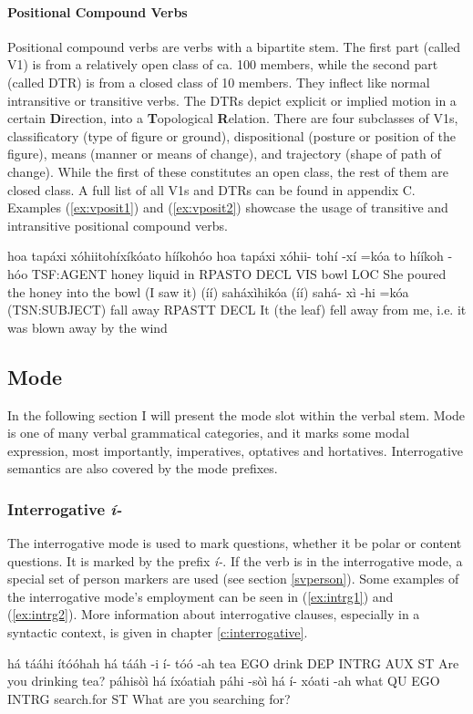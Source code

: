 \documentclass[a4paper, 12pt, oneside]{memoir}
\newcommand{\emh}[1]{\textit{#1}}
\begin{document}
\paragraph{Positional Compound Verbs}
Positional compound verbs are verbs with a bipartite stem. The first part (called V1) is from a relatively open class of ca. 100 members, while the second part (called DTR) is from a closed class of 10 members. They inflect like normal intransitive or transitive verbs. The DTRs depict explicit or implied motion in a certain \textbf{D}irection, into a \textbf{T}opological \textbf{R}elation. There are four subclasses of V1s, classificatory (type of figure or ground), dispositional (posture or position of the figure), means (manner or means of change), and trajectory (shape of path of change). While the first of these constitutes an open class, the rest of them are closed class. A full list of all V1s and DTRs can be found in appendix C. Examples (\ref{ex:vposit1}) and (\ref{ex:vposit2}) showcase the usage of transitive and intransitive positional compound verbs.
\begin{examples}
\newbaarucmd{\cl}{\baarujuncture{\texttt{==}}}
    \ex \label{ex:vposit1}
    \words hoa tapáxi xóhiitohíxíkóato hííkohóo
    \bits hoa tapáxi xóhii- tohí -xí =kóa \cl to hííkoh -hóo
    \gloss TSF:AGENT honey liquid in RPASTO DECL VIS bowl LOC
    \tr She poured the honey into the bowl (I saw it)
    \ex \label{ex:vposit2}
    \words (íí) saháxìhikóa
    \bits (íí) sahá- xì -hi =kóa 
    \gloss (TSN:SUBJECT) fall away RPASTT DECL
    \tr It (the leaf) fell away from me, i.e. it was blown away by the wind
\end{examples}

\subsection{Mode}\label{svmode}
In the following section I will present the mode slot within the verbal stem. Mode is one of many verbal grammatical categories, and it marks some modal expression, most importantly, imperatives, optatives and hortatives. Interrogative semantics are also covered by the mode prefixes. 
\subsubsection{Interrogative \emh{í-}}
The interrogative mode is used to mark questions, whether it be polar or content questions. It is marked by the prefix \emh{í-}. If the verb is in the interrogative mode, a special set of person markers are used (see section \ref{svperson}). Some examples of the interrogative mode's employment can be seen in (\ref{ex:intrg1}) and (\ref{ex:intrg2}). More information about interrogative clauses, especially in a syntactic context, is given in chapter \ref{c:interrogative}.
\begin{examples}
    \ex \label{ex:intrg1}
     há tááhi ítóóhah
     há tááh -i í- tóó -ah
    \gloss tea EGO drink DEP INTRG AUX ST 
    \tr Are you drinking tea?
    \ex \label{ex:intrg2}
    \words páhisòì há íxóatiah 
    \bits páhi -sòì há í- xóati -ah
    \gloss what QU EGO INTRG search.for ST
    \tr What are you searching for?
\end{examples}
\end{document}
